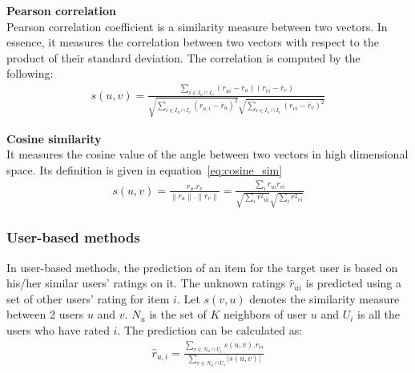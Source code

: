 \documentclass[oneside,13pt]{extreport}
\begin{document}
\begin{description}
    \item{\textbf{Pearson correlation}} 
    \\Pearson correlation coefficient is a similarity measure between two vectors. In essence, it measures the correlation between two vectors with respect to the product of their standard deviation. The correlation is computed by the following:
    \begin{eqnarray}
	\label{eq:pearson_sim}
	s\left( {u,v} \right) = \frac{{\sum\nolimits_{i \in {I_u} \cap {I_v}} {({r_{ui}} - \bar r_u )({r_{vi}} - \bar r_v )} }}{{\sqrt {\sum\nolimits_{i \in {I_u} \cap {I_v}} {{{({r_{u,i}} - \bar r_u )}^2}} } \sqrt {\sum\nolimits_{i \in {I_u} \cap {I_v}} {{{({r_{vi}} - \bar r_v )}^2}} } }}
	\end{eqnarray} 
    \item{\textbf{Cosine similarity}} 
    \\It measures the cosine value of the angle between two vectors in high dimensional space. Its definition is given in equation~\ref{eq:cosine_sim}
    \begin{eqnarray}
	\label{eq:cosine_sim}
	s\left( {u,v} \right) = \frac{{{r_u}.{r_v}}}{{\left\| {{r_u}} \right\|.\left\| {{r_v}} \right\|}} = \frac{{\sum\nolimits_i {{r_{ui}}{r_{vi}}} }}{{\sqrt {\sum\nolimits_i {{r^2}_{ui}} } \sqrt {\sum\nolimits_i {{r^2}_{vi}} } }}
	\end{eqnarray}
	
\end{description}
  
\subsubsection{User-based methods}
In user-based methods, the prediction of an item for the target user is based on his/her similar users’ ratings on it. The unknown ratings $\hat r_{ui}$ is predicted using
a set of other users’ rating for item $i$. Let $s\left( {v,u} \right)$ denotes the similarity
measure between 2 users $u$ and $v$. $N_u$ is the set of $K$ neighbors of user $u$ and $U_i$ is all the users who have rated $i$. The prediction can be calculated as:
\begin{eqnarray}
\label{eq:user_based_pre1}
\hat r_{u,i} = \frac{{\sum\limits_{v \in {N_u} \cap {U_i}} {{s\left( {u,v} \right)}.{r_{vi}}} }}{{\sum\limits_{v \in {N_u} \cap {U_i}} {\left| {s\left( {u,v} \right)} \right|} }}
\end{eqnarray}
\end{document}
